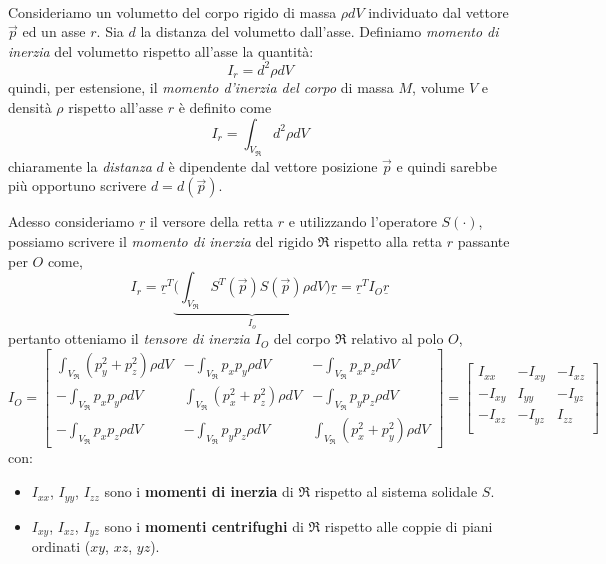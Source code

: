 \paragraph{}
Consideriamo un volumetto del corpo rigido di massa $\rho dV$ individuato dal vettore $\vec{p}$ ed un asse $r$. Sia $d$ la distanza del volumetto dall'asse. Definiamo \emph{momento di inerzia} del volumetto rispetto all'asse la quantità:
\begin{equation}
	I_r = d^2 \rho dV
\end{equation}
quindi, per estensione, il \emph{momento d'inerzia del corpo} di massa $M$, volume $V$ e densità $\rho$ rispetto all'asse $r$ è definito come
\begin{equation}
	I_r = \int_{V_{\mathfrak{R}}} d^2 \rho dV
\end{equation}
chiaramente la \emph{distanza} $d$ è dipendente dal vettore posizione $\vec{p}$ e quindi sarebbe più opportuno scrivere $d = d(\vec{p})$.

Adesso consideriamo $\underline{r}$ il versore della retta $r$ e utilizzando l'operatore $S(\cdot)$, possiamo scrivere il \emph{momento di inerzia} del rigido $\mathfrak{R}$ rispetto alla retta $r$ passante per $O$ come,
\begin{equation}
I_r = \underline{r}^T \underbrace{\Biggl( \int_{V_{\mathfrak{R}}} S^T(\vec{p}) S(\vec{p}) \rho dV \Biggr)}_{I_o} \underline{r} = \underline{r}^T I_O \underline{r}
\end{equation}
pertanto otteniamo il \emph{tensore di inerzia} $I_O$ del corpo $\mathfrak{R}$ relativo al polo $O$,
\begin{equation*}
	I_O = 
	\begin{bmatrix}
		\int_{V_{\mathfrak{R}}} (p_y^2 + p_z^2) \rho dV & - \int_{V_{\mathfrak{R}}} p_xp_y \rho dV & - \int_{V_{\mathfrak{R}}} p_xp_z \rho dV \\
		- \int_{V_{\mathfrak{R}}} p_xp_y \rho dV & \int_{V_{\mathfrak{R}}} (p_x^2 + p_z^2) \rho dV & - \int_{V_{\mathfrak{R}}} p_yp_z \rho dV \\
		- \int_{V_{\mathfrak{R}}} p_xp_z \rho dV & - \int_{V_{\mathfrak{R}}} p_yp_z \rho dV & \int_{V_{\mathfrak{R}}} (p_x^2 + p_y^2) \rho dV
	\end{bmatrix}
	= 
	\begin{bmatrix}
		I_{xx} & -I_{xy} & -I_{xz} \\
		- I_{xy} & I_{yy} & -I_{yz} \\
		-I_{xz} & -I_{yz} & I_{zz} \\
	\end{bmatrix}
\end{equation*}
con:
\begin{itemize}
	\item $I_{xx}$, $I_{yy}$, $I_{zz}$ sono i \textbf{momenti di inerzia} di $\mathfrak{R}$ rispetto al sistema solidale $S$.
	\item $I_{xy}$, $I_{xz}$, $I_{yz}$ sono i \textbf{momenti centrifughi} di $\mathfrak{R}$ rispetto alle coppie di piani ordinati ($xy$, $xz$, $yz$).
\end{itemize}

